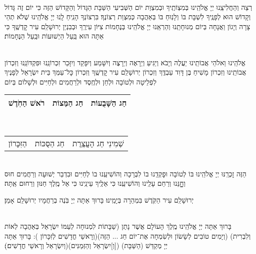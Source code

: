 \documentclass[twoside, openany, parskip=half, 11pt]{book}
\begin{document}
\vspace{-.25\baselineskip}
\begin{sometimes}

\shabbos\\
רְצֵה וְהַחֲלִיצֵֽנוּ יְיָ אֱלֹהֵֽינוּ בְּמִצְוֹתֶֽיךָ וּבְמִצְוַת יוֹם הַשְּׁבִיעִי הַשַּׁבָּת הַגָּדוֹל וְהַקָּדוֹשׁ הַזֶּה כִּי יוֹם זֶה גָּדוֹל וְקָדוֹשׁ הוּא לְפָנֶֽיךָ לִשְׁבָּת בּוֹ וְלָנֽוּחַ בּוֹ בְּאַהֲבָה כְּמִצְוַת רְצוֹנֶךָ׃ בִּרְצוֹנְךָ הָנִֽיחַ לָֽנוּ יְיָ אֱלֹהֵֽינוּ שֶׁלֹא תְהֵי צָרָה וְיָגוֹן וַאֲנָחָה בְּיוֹם מְנוּחָתֵֽנוּ וְהַרְאֵֽנוּ יְיָ אֱלֹהֵֽינוּ בְּנֶחָמוֹת צִיּוֹן עִירֶֽךָ וּבְבִנְיַן יְרוּשָׁלַ‍ִם עִיר קׇדְשֶֽׁךָ כִּי אַתָּה הוּא בַּֽעַל הַיְשׁוּעוֹת וּבַֽעַל הַנֶּחָמוֹת׃


\sepline %

\vspace{-.25\baselineskip}
\\
אֱלֹהֵֽינוּ וֵאלֹהֵי אֲבוֹתֵֽינוּ יַעֲלֶה וְיָבֹא וְיַגִּיעַ וְיֵרָאֶה וְיֵרָצֶה וְיִשָּׁמַע וְיִפָּקֵד וְיִזָּכֵר זִכְרוֹנֵֽנוּ וּפִקְדּוֹנֵֽנוּ וְזִכְרוֹן אֲבוֹתֵֽינוּ וְזִכְרוֹן מָשִׁיחַ בֶּן דָּוִד עַבְדֶּֽךָ וְזִכְרוֹן יְרוּשָׁלַ‍ִם עִיר קׇדְשֶֽׁךָ וְזִכְרוֹן כׇּל־עַמְּךָ בֵּית יִשְׂרָאֵל לְפָנֶיךָ לִפְלֵיטָה וּלְטוֹבָה וּלְחֵן וּלְחֶֽסֶד וּלְרַחֲמִים וּלְחַיִּים וּלְשָׁלוֹם בְּיוֹם\\
\begin{tabular}{c|c|c}
רֹאשׁ הַחֹֽדֶשׁ & חַג הַמַּצוֹת & חַג הַשָּׁבֻעוֹת\\ \hline
\end{tabular}\\
\begin{tabular}{c|c|c}
הַזִּכָּרוֹן & חַג הַסֻּכּוֹת & שְׁמִינִי חַג הָעֲצֶֽרֶת
\end{tabular}\\
הַזֶּה זׇכְרֵֽנּוּ יְיָ אֱלֹהֵֽינוּ בּוֹ לְטוֹבָה וּפׇקְדֵֽנוּ בוֹ לִבְרָכָה וְהוֹשִׁיעֵֽנוּ בוֹ לְחַיִּים וּבִדְבַר יְשׁוּעָה וְרַחֲמִים חוּס וְחׇׇׇׇנֵּנוּ וְרַחֵם עָלֵֽינוּ וְהוֹשִׁיעֵֽנוּ כִּי אֵלֶֽיךָ עֵינֵֽינוּ כִּי אֵל מֶֽלֶךְ חַנּוּן וְרַחוּם אַֽתָּה׃

\end{sometimes}

יְרוּשָׁלַ‍ִם עִיר הַקֹּֽדֶשׁ בִּמְהֵרָה בְּיָמֵֽינוּ׃ בָּרוּךְ אַתָּה יְיָ בֹּֽנֶה בְרַחֲמָיו יְרוּשָׁלַ‍ִם אָמֵן׃

\begin{sometimes}

\\
בָּרוּךְ אַתָּה יְיָ אֱלֹהֵֽינוּ מֶֽלֶךְ הָעוֹלָם אֲשֶׁר נָתַן (שַׁבָּתוֹת לִמְנוּחָה לְעַמּוֹ יִשְׂרָאֵל בְּאַהֲבָה לְאוֹת וְלִבְרִית)
(וְיָמִים טוֹבִים לְשָׂשׂוֹן וּלְשִׂמְחָה אֶת־יוֹם חַג ... הַזֶּה)(וְרָאשֵׁי חֳדָשִׁים לְזִכָּרוֹן ):
בָּרוּךְ אַתָּה יְיָ מְקַדֵּשׁ (הַשַּׁבָּת) ([וְ]יִשְׂרָאֵל וְהַזְּמַנִּים)(וְיִשְׂרָאֵל וְרָאשֵׁי חֳדָשִׁים׃)׃

\end{sometimes}
\end{document}
